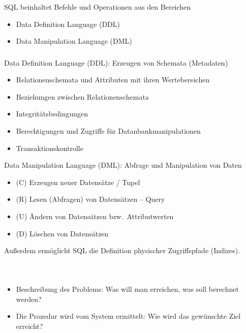 \begin{frame}[t]\frametitle{\insertsection}
\framesubtitle{\insertsubsection}
SQL beinhaltet Befehle und Operationen aus den Bereichen\\[8pt]
\begin{itemize}
	\item Data Definition Language (DDL)\\[4pt]
	\item Data Manipulation Language (DML)
\end{itemize}
\end{frame}

\begin{frame}[t]\frametitle{\insertsection}
\framesubtitle{\insertsubsection}
\onslide
Data Definition Language (DDL): Erzeugen von Schemata (Metadaten)\\[4pt]
\begin{itemize}
\item Relationenschemata und Attributen mit ihren Wertebereichen
\item Beziehungen zwischen Relationenschemata
\item Integrit\"atsbedingungen
\item Berechtigungen und Zugriffe f\"ur Datanbankmanipulationen  
\item Transaktionskontrolle
\end{itemize}
\pause
\abs
Data Manipulation Language (DML): Abfrage und Manipulation von Daten\\[4pt]
\begin{itemize}
\item (C) Erzeugen neuer Datens\"atze / Tupel
\item (R) Lesen (Abfragen) von Datens\"atzen -- Query
\item (U) \"Andern von Datens\"atzen bzw.~Attributwerten
\item (D) L\"oschen von Datens\"atzen
\end{itemize}
\pause
\abs
Au\ss erdem erm\"oglicht SQL die Definition physischer Zugriffspfade (Indizes).
\end{frame}

\begin{frame}[fragile]\frametitle{\insertsection}
\framesubtitle{\insertsubsection}
	\\[8pt]
\begin{itemize}
	\item Beschreibung des Problems: Was will man erreichen, was soll berechnet werden?
	\item Die Prozedur wird vom System ermittelt: Wie wird das gew\"unschte Ziel erreicht?
\end{itemize}
\end{frame}

